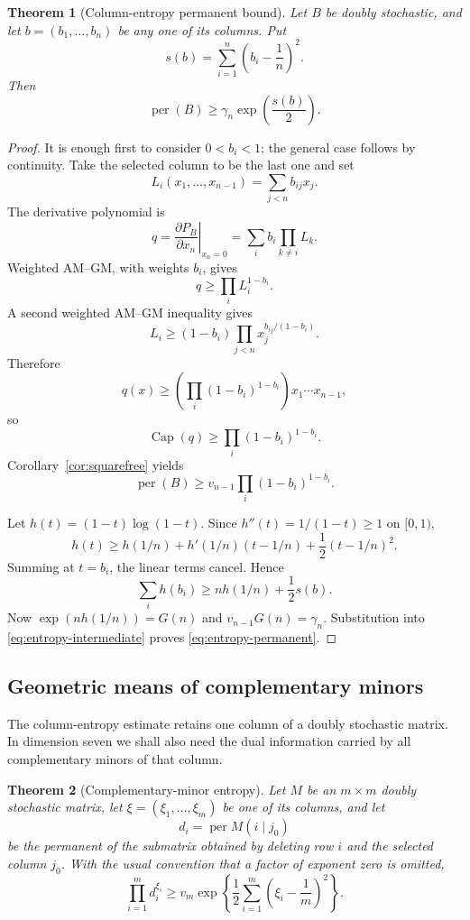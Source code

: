 \documentclass[11pt]{article}
\newtheorem{theorem}{Theorem}[section]
\theoremstyle{definition}
\newcommand{\per}{\operatorname{per}}
\newcommand{\pcap}{\operatorname{Cap}}
\newcommand{\1}{\mathbf{1}}
\begin{document}
\begin{theorem}[Column-entropy permanent bound]\label{thm:column-entropy}
Let $B$ be doubly stochastic, and let $b=(b_1,\dots,b_n)$ be any one of its columns.  Put
\[
 s(b)=\sum_{i=1}^n\left(b_i-\frac1n\right)^2.
\]
Then
\[
 \per(B)\ge\gamma_n\exp\left(\frac{s(b)}2\right).
 \tag{3.10}\label{eq:entropy-permanent}
\]
\end{theorem}

\begin{proof}
It is enough first to consider $0<b_i<1$; the general case follows by continuity.  Take the selected column to be the last one and set
\[
 L_i(x_1,\dots,x_{n-1})=\sum_{j<n}b_{ij}x_j.
\]
The derivative polynomial is
\[
 q=\left.\frac{\partial P_B}{\partial x_n}\right|_{x_n=0}
 =\sum_i b_i\prod_{k\ne i}L_k.
\]
Weighted AM--GM, with weights $b_i$, gives
\[
 q\ge\prod_iL_i^{1-b_i}.
\]
A second weighted AM--GM inequality gives
\[
 L_i\ge(1-b_i)
 \prod_{j<n}x_j^{b_{ij}/(1-b_i)}.
\]
Therefore
\[
 q(x)\ge
 \left(\prod_i(1-b_i)^{1-b_i}\right)x_1\cdots x_{n-1},
\]
so
\[
 \pcap(q)\ge\prod_i(1-b_i)^{1-b_i}.
\]
Corollary~\ref{cor:squarefree} yields
\[
 \per(B)\ge
 v_{n-1}\prod_i(1-b_i)^{1-b_i}.
 \tag{3.11}\label{eq:entropy-intermediate}
\]

Let $h(t)=(1-t)\log(1-t)$.  Since $h''(t)=1/(1-t)\ge1$ on $[0,1)$,
\[
 h(t)\ge h(1/n)+h'(1/n)(t-1/n)+\frac12(t-1/n)^2.
\]
Summing at $t=b_i$, the linear terms cancel.  Hence
\[
 \sum_i h(b_i)
 \ge nh(1/n)+\frac12s(b).
\]
Now $\exp(nh(1/n))=G(n)$ and $v_{n-1}G(n)=\gamma_n$.  Substitution into \eqref{eq:entropy-intermediate} proves \eqref{eq:entropy-permanent}.
\end{proof}


\subsection{Geometric means of complementary minors}

The column-entropy estimate retains one column of a doubly stochastic
matrix.  In dimension seven we shall also need the dual information carried
by all complementary minors of that column.

\begin{theorem}[Complementary-minor entropy]\label{thm:minor-entropy}
Let $M$ be an $m\times m$ doubly stochastic matrix, let
$\xi=(\xi_1,\dots,\xi_m)$ be one of its columns, and let
\[
 d_i=\per M(i\mid j_0)
\]
be the permanent of the submatrix obtained by deleting row $i$ and the
selected column $j_0$.  With the usual convention that a factor of exponent
zero is omitted,
\[
 \prod_{i=1}^m d_i^{\xi_i}
 \ge
 v_m\exp\left\{
 \frac12\sum_{i=1}^m\left(\xi_i-\frac1m\right)^2
 \right\}.
 \tag{3.12}\label{eq:minor-entropy}
\]
\end{theorem}
\end{document}
